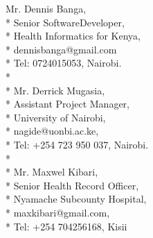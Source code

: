 \documentclass{brian_ats}
\begin{document}
Mr. Dennis Banga,\\*
Senior SoftwareDeveloper,\\*
Health Informatics for Kenya, \\*
dennisbanga@gmail.com\\*
Tel: 0724015053, Nairobi.\\*\\*
\noindent
Mr. Derrick Mugasia, \\*
Assistant Project Manager, \\*
University of Nairobi, \\*
nagide@uonbi.ac.ke, \\*
Tel: +254 723 950 037, Nairobi.\\*\\*
\noindent
Mr. Maxwel Kibari,\\*
Senior Health Record Officer,\\*
Nyamache Subcounty Hospital,\\*
maxkibari@gmail.com,\\*
Tel: +254 704256168, Kisii
\end{document}
